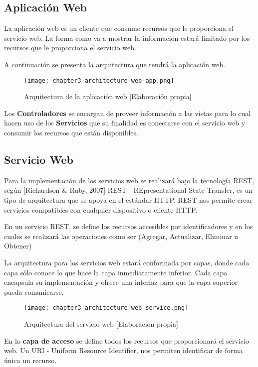 \subsection{Aplicación Web}
\noindent La aplicación web es un cliente que consume recursos que le proporciona el servicio web. La forma como va a mostrar la información estará limitado por los recursos que le proporciona el servicio web.

\noindent A continuación se presenta la arquitectura que tendrá la aplicación web.
\begin{figure}[H]
  \centering
  \texttt{[image: chapter3-architecture-web-app.png]}
  \caption{Arquitectura de la aplicación web [Elaboración propia]}  
\end{figure} 

\noindent Los \textbf{Controladores} se encargan de proveer información a las vistas para lo cual hacen uso de los \textbf{Servicios} que su finalidad es conectarse con el servicio web y consumir los recursos que están disponibles.

\subsection{Servicio Web}
\noindent Para la implementación de los servicios web se realizará bajo la tecnología REST, según [Richardson \& Ruby, 2007] REST - REpresentational State Transfer, es un tipo de arquitectura que se apoya en el estándar HTTP. REST nos permite crear servicios compatibles con cualquier dispositivo o cliente HTTP.

\noindent En un servicio REST, se define los recursos accesibles por identificadores y en los cuales se realizará las operaciones como ser (Agregar, Actualizar, Eliminar u Obtener)

\noindent La arquitectura para los servicios web estará conformada por capas, donde cada capa sólo conoce lo que hace la capa inmediatamente inferior. Cada capa encapsula su implementación y ofrece una interfaz para que la capa superior pueda comunicarse.
\begin{figure}[H]
  \centering
  \texttt{[image: chapter3-architecture-web-service.png]}
  \caption{Arquitectura del servicio web [Elaboración propia]}  
\end{figure}
 \noindent En la \textbf{capa de acceso} se define todos los recursos que proporcionará el servicio web. Un URI - Uniform Resource Identifier, nos permiten identificar de forma única un recurso.


